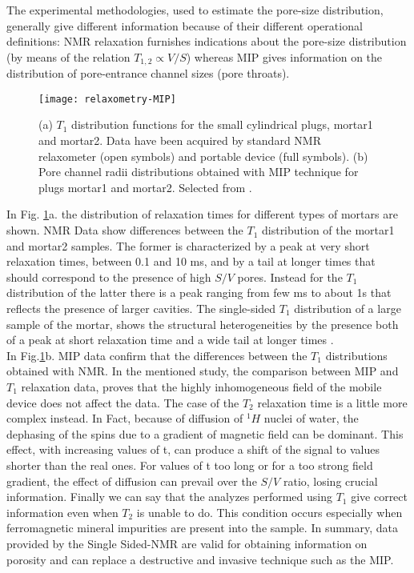 \documentclass[a4paper,11pt]{report}
\begin{document}
 The experimental methodologies, used to estimate the pore-size distribution, generally give different information because of their different operational definitions: NMR relaxation furnishes indications about the pore-size distribution (by means of the relation $T_{1,2} \propto V/S$) whereas MIP gives information on the distribution of pore-entrance channel sizes (pore throats).\\
\begin{figure}[h] 

\centering
\texttt{[image: relaxometry-MIP]}
\caption{(a) $T_1$ distribution functions for the small cylindrical plugs, mortar1 and mortar2. Data have been acquired by standard NMR relaxometer (open symbols) and portable device (full symbols). (b) Pore channel radii distributions obtained with MIP technique for plugs mortar1 and mortar2. Selected from \cite{due}. }\label{relaxometry-MIP}
\end{figure}
In Fig. \ref{relaxometry-MIP}a. the distribution of relaxation times for different types of mortars are shown. NMR Data show differences between the $T_1$ distribution of the mortar1 and mortar2 samples. The former is characterized by a peak at very short relaxation times, between 0.1 and 10 ms, and by a tail at longer times that should correspond to the presence of high $S/V$ pores. Instead for the $T_1$ distribution of the latter there is a peak ranging from few ms to about 1s that reflects the presence of larger cavities. The single-sided $T_1$ distribution of a large sample of the mortar, shows the structural heterogeneities by the presence both of a peak at short relaxation time and a wide tail at longer times \cite{due}. \\
In Fig.\ref{relaxometry-MIP}b. MIP data confirm that the differences between the $T_1$ distributions obtained with NMR. In the mentioned study, the comparison between MIP and $T_1$ relaxation data, proves that the highly inhomogeneous field of the mobile device does not affect the data. The case of the $T_2$ relaxation time is a little more complex instead. In Fact, because of diffusion of $^1H$ nuclei of water, the dephasing of the spins due to a gradient of magnetic field can be dominant. This effect, with increasing values of t, can produce a shift of the signal to values shorter than the real ones. For values of t too long or for a too strong field gradient, the effect of diffusion can prevail over the $S/V$ ratio, losing crucial information. Finally we can say that the analyzes performed using $T_1$ give correct information even when $T_2$ is unable to do. This condition occurs especially when ferromagnetic mineral impurities are present into the sample. In summary, data provided by the Single Sided-NMR are valid for obtaining information on porosity and can replace a destructive and invasive technique such as the MIP.\\
\end{document}
